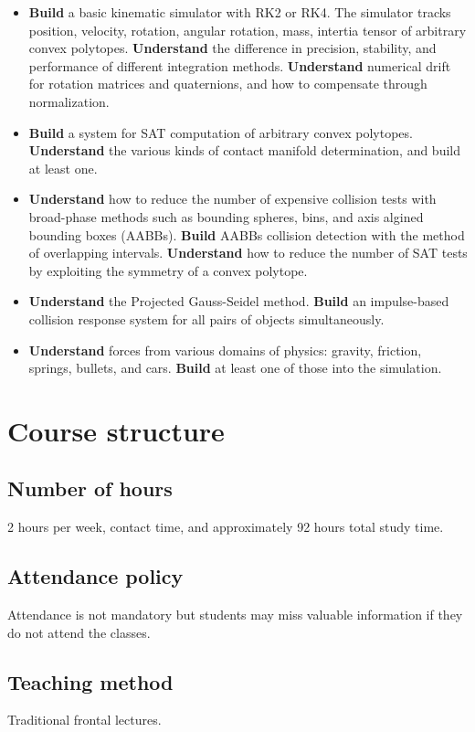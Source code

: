 \documentclass{article}
\begin{document}
\begin{itemize}
\item \textbf{Build} a basic kinematic simulator with RK2 or RK4. The simulator tracks position, velocity, rotation, angular rotation, mass, intertia tensor of arbitrary convex polytopes. \textbf{Understand} the difference in precision, stability, and performance of different integration methods. \textbf{Understand} numerical drift for rotation matrices and quaternions, and how to compensate through normalization.
\item \textbf{Build} a system for SAT computation of arbitrary convex polytopes. \textbf{Understand} the various kinds of contact manifold determination, and build at least one.
\item \textbf{Understand} how to reduce the number of expensive collision tests with broad-phase methods such as bounding spheres, bins, and axis algined bounding boxes (AABBs). \textbf{Build} AABBs collision detection with the method of overlapping intervals. \textbf{Understand} how to reduce the number of SAT tests by exploiting the symmetry of a convex polytope.
\item \textbf{Understand} the Projected Gauss-Seidel method. \textbf{Build} an impulse-based collision response system for all pairs of objects simultaneously.
\item \textbf{Understand} forces from various domains of physics: gravity, friction, springs, bullets, and cars. \textbf{Build} at least one of those into the simulation.
\end{itemize}


\section{Course structure}
\subsection{Number of hours}
2 hours per week, contact time, and approximately 92 hours total study time.


\subsection{Attendance policy}
Attendance is not mandatory but students may miss valuable information if they do not attend the classes.


\subsection{Teaching method}
Traditional frontal lectures.
\end{document}

